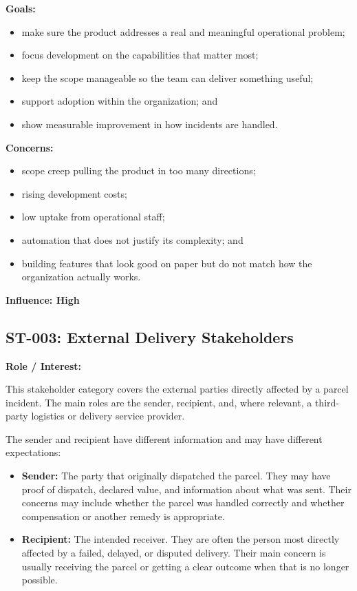 \documentclass[11pt,a4paper]{article}
\begin{document}
\textbf{Goals:}

\begin{itemize}
    \item make sure the product addresses a real and meaningful
    operational problem;
    \item focus development on the capabilities that matter most;
    \item keep the scope manageable so the team can deliver
    something useful;
    \item support adoption within the organization; and
    \item show measurable improvement in how incidents are handled.
\end{itemize}

\textbf{Concerns:}

\begin{itemize}
    \item scope creep pulling the product in too many directions;
    \item rising development costs;
    \item low uptake from operational staff;
    \item automation that does not justify its complexity; and
    \item building features that look good on paper but do not
    match how the organization actually works.
\end{itemize}

\textbf{Influence: High}


\subsection{ST-003: External Delivery Stakeholders}

\textbf{Role / Interest:}

This stakeholder category covers the external parties directly
affected by a parcel incident. The main roles are the sender,
recipient, and, where relevant, a third-party logistics or delivery
service provider.

The sender and recipient have different information and may have
different expectations:

\begin{itemize}
    \item \textbf{Sender:} The party that originally dispatched the
    parcel. They may have proof of dispatch, declared value, and
    information about what was sent. Their concerns may include
    whether the parcel was handled correctly and whether compensation
    or another remedy is appropriate.

    \item \textbf{Recipient:} The intended receiver. They are often
    the person most directly affected by a failed, delayed, or
    disputed delivery. Their main concern is usually receiving the
    parcel or getting a clear outcome when that is no longer possible.
\end{itemize}
\end{document}
